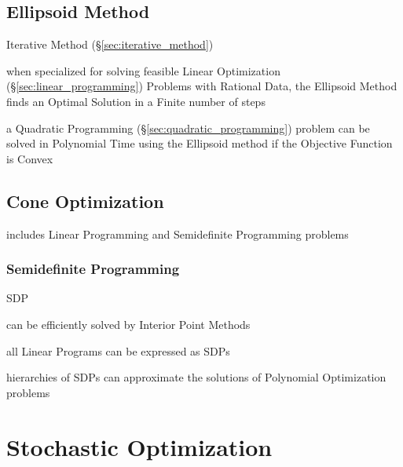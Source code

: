 \subsection{Ellipsoid Method}\label{sec:ellipsoid_method}

Iterative Method (\S\ref{sec:iterative_method})

when specialized for solving feasible Linear Optimization
(\S\ref{sec:linear_programming}) Problems with Rational Data, the Ellipsoid
Method finds an Optimal Solution in a Finite number of steps

a Quadratic Programming (\S\ref{sec:quadratic_programming}) problem can be
solved in Polynomial Time using the Ellipsoid method if the Objective Function
is Convex



\subsection{Cone Optimization}\label{sec:cone_optimization}

includes Linear Programming and Semidefinite Programming problems



\subsubsection{Semidefinite Programming}\label{sec:semidefinite_programming}

SDP

can be efficiently solved by Interior Point Methods

all Linear Programs can be expressed as SDPs

hierarchies of SDPs can approximate the solutions of Polynomial Optimization
problems



\section{Stochastic Optimization}\label{sec:stochastic_optimization}

